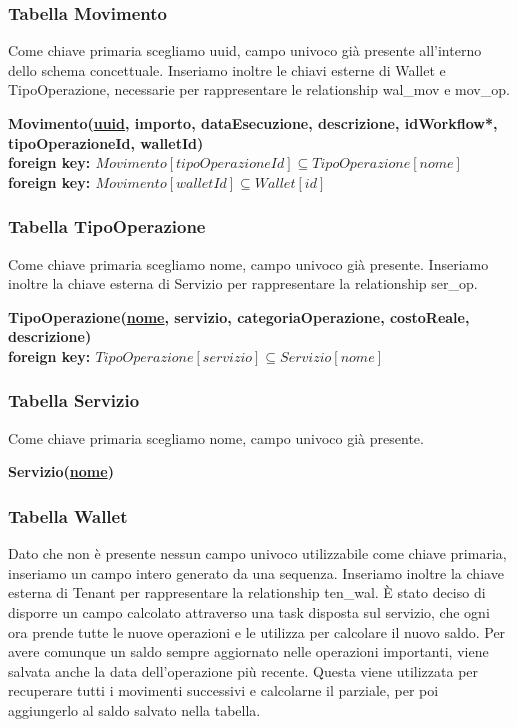 \subsubsection{Tabella Movimento}
Come chiave primaria scegliamo uuid, campo univoco gi\`a presente all'interno dello schema concettuale. Inseriamo inoltre le chiavi esterne di Wallet e TipoOperazione,
necessarie per rappresentare le relationship wal\_mov e mov\_op.

\textbf{Movimento(\underline{uuid}, importo, dataEsecuzione, descrizione, idWorkflow*,\\ tipoOperazioneId, walletId) \\}
\textbf{\hspace*{1.5 cm} foreign key: $ Movimento[tipoOperazioneId] \subseteq TipoOperazione[nome] $} \\
\textbf{\hspace*{1.5 cm} foreign key: $ Movimento[walletId] \subseteq Wallet[id] $ }

\subsubsection{Tabella TipoOperazione}
Come chiave primaria scegliamo nome, campo univoco gi\`a presente. Inseriamo inoltre la chiave esterna di Servizio per rappresentare la relationship ser\_op.

\textbf{TipoOperazione(\underline{nome}, servizio, categoriaOperazione, costoReale, \\descrizione) \\}
\textbf{\hspace*{1.5 cm} foreign key: $ TipoOperazione[servizio] \subseteq Servizio[nome] $}

\subsubsection{Tabella Servizio}
Come chiave primaria scegliamo nome, campo univoco gi\`a presente.

\textbf{Servizio(\underline{nome})}

\subsubsection{Tabella Wallet}
Dato che non \`e presente nessun campo univoco utilizzabile come chiave primaria, inseriamo un campo intero generato da una sequenza. Inseriamo inoltre la chiave esterna
di Tenant per rappresentare la relationship ten\_wal.
\`E stato deciso di disporre un campo calcolato attraverso una task disposta sul servizio, che ogni ora prende tutte le nuove operazioni e le utilizza per
calcolare il nuovo saldo. Per avere comunque un saldo sempre aggiornato nelle operazioni importanti, viene salvata anche la data dell'operazione più recente. Questa viene
utilizzata per recuperare tutti i movimenti successivi e calcolarne il parziale, per poi aggiungerlo al saldo salvato nella tabella.

